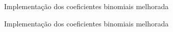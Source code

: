 \begin{frame}[fragile]{Implementação dos coeficientes binomiais melhorada}
\end{frame}

\begin{frame}[fragile]{Implementação dos coeficientes binomiais melhorada}
\end{frame}
